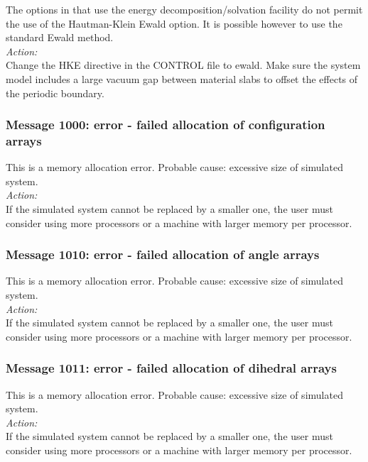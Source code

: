 The options in \D{} that use the energy decomposition/solvation facility do not
permit the use of the Hautman-Klein Ewald option. It is possible however to
use the standard Ewald method.\\

\noindent
{\em Action:}\\
Change the HKE directive in the CONTROL file to ewald. Make sure the system
model includes a large vacuum gap between material slabs  to offset the
effects of the periodic boundary.

\subsubsection*{Message 1000: error - failed allocation of
configuration arrays}

This is a memory allocation error. Probable cause: excessive size of
simulated system. \\

\noindent
{\em Action:}\\
If the simulated system cannot be replaced by a smaller one, the user
must consider using more processors or a machine with larger memory
per processor.

\subsubsection*{Message 1010: error - failed allocation of angle
arrays}

This is a memory allocation error. Probable cause: excessive size of
simulated system. \\

\noindent
{\em Action:}\\
If the simulated system cannot be replaced by a smaller one, the user
must consider using more processors or a machine with larger memory
per processor.

\subsubsection*{Message 1011: error - failed allocation of dihedral
arrays}

This is a memory allocation error. Probable cause: excessive size of
simulated system. \\

\noindent
{\em Action:}\\
If the simulated system cannot be replaced by a smaller one, the user
must consider using more processors or a machine with larger memory
per processor.

